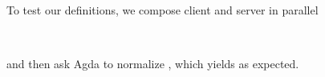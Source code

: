 To test our definitions, we compose client and server in parallel
\begin{code}%
\>[0]\AgdaSpace{}%
\AgdaSymbol{:}\AgdaSpace{}%
\AgdaSpace{}%
\AgdaOperator{\AgdaFunction{[}}\AgdaSpace{}%
\AgdaSpace{}%
\AgdaOperator{\AgdaFunction{]}}\<%
\\
\>[0]\AgdaSpace{}%
\AgdaSymbol{=}\AgdaSpace{}%
\AgdaSpace{}%
\AgdaSpace{}%
\AgdaSpace{}%
\AgdaSymbol{(}\AgdaOperator{\AgdaInductiveConstructor{<}}\AgdaSpace{}%
\AgdaSymbol{)}\AgdaSpace{}%
\<%
\end{code}
and then ask Agda to normalize , which yields
 as expected.

